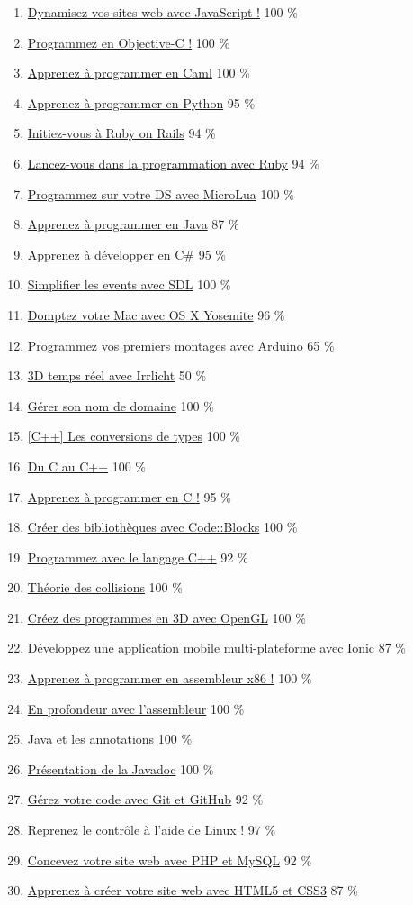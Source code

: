 \documentclass{article}
\newcommand{\lesson}[3]
{
	\item \href{https://openclassrooms.com/courses/#1}{#2} #3 \%
}
\begin{document}
\begin{enumerate}
		\lesson{1916641}{Dynamisez vos sites web avec JavaScript !}{100}
		\lesson{149791}{Programmez en Objective-C !}{100}
		\lesson{1818146}{Apprenez à programmer en Caml}{100}
		\lesson{235344}{Apprenez à programmer en Python}{95}
		\lesson{3149156}{Initiez-vous à Ruby on Rails}{94}
		\lesson{2913686}{Lancez-vous dans la programmation avec Ruby}{94}
		\lesson{1460761}{Programmez sur votre DS avec MicroLua}{100}
		\lesson{26832}{Apprenez à programmer en Java}{87}
		\lesson{1526901}{Apprenez à développer en C\#}{95}
		\lesson{1197041}{Simplifier les events avec SDL}{100}
		\lesson{2383231}{Domptez votre Mac avec OS X Yosemite}{96}
		\lesson{2778161}{Programmez vos premiers montages avec Arduino}{65}
		\lesson{1414021}{3D temps réel avec Irrlicht}{50}
		\lesson{1243111}{Gérer son nom de domaine}{100}
		\lesson{1170641}{[C++] Les conversions de types}{100}
		\lesson{1421911}{Du C au C++}{100}
		\lesson{19980}{Apprenez à programmer en C !}{95}
		\lesson{1090416}{Créer des bibliothèques avec Code::Blocks}{100}
		\lesson{1894236}{Programmez avec le langage C++}{92}
		\lesson{1374826}{Théorie des collisions}{100}
		\lesson{167717}{Créez des programmes en 3D avec OpenGL}{100}
		\lesson{3013711}{Développez une application mobile multi-plateforme avec Ionic}{87}
		\lesson{2288321}{Apprenez à programmer en assembleur x86 !}{100}
		\lesson{1464031}{En profondeur avec l'assembleur}{100}
		\lesson{1746031}{Java et les annotations}{100}
		\lesson{1115306}{Présentation de la Javadoc}{100}
		\lesson{2342361}{Gérez votre code avec Git et GitHub}{92}
		\lesson{43538}{Reprenez le contrôle à l'aide de Linux !}{97}
		\lesson{918836}{Concevez votre site web avec PHP et MySQL}{92}
		\lesson{1603881}{Apprenez à créer votre site web avec HTML5 et CSS3}{87}
					 
	\end{enumerate}
\end{document}
